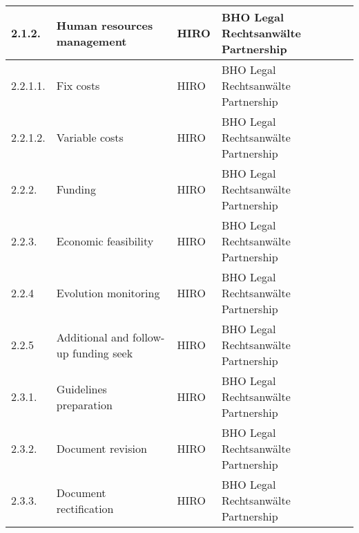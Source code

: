 \begin{longtable}[H]{p{1.5cm} >{\raggedright\arraybackslash}p{4cm} >{\raggedright\arraybackslash}p{3.8cm} >{\raggedright\arraybackslash}p{4cm}}
	\midrule
	
	2.1.2. & Human resources management & HIRO & BHO Legal Rechtsanwälte Partnership\vspace{0.2cm} \\
	
	\midrule
	
	2.2.1.1. & Fix costs & HIRO & BHO Legal Rechtsanwälte Partnership\vspace{0.2cm} \\
	
	\midrule
	
	2.2.1.2. & Variable costs & HIRO & BHO Legal Rechtsanwälte Partnership\vspace{0.2cm} \\
	
	\midrule
	
	2.2.2. & Funding & HIRO & BHO Legal Rechtsanwälte Partnership\vspace{0.2cm} \\
	
	\midrule
	
	2.2.3. & Economic feasibility & HIRO & BHO Legal Rechtsanwälte Partnership\vspace{0.2cm} \\
	
	\midrule
	
	2.2.4 & Evolution monitoring & HIRO & BHO Legal Rechtsanwälte Partnership\vspace{0.2cm} \\
	
	\midrule
	
	2.2.5 & Additional and follow-up funding seek & HIRO & BHO Legal Rechtsanwälte Partnership\vspace{0.2cm} \\
	
	\midrule
	
	2.3.1. & Guidelines preparation & HIRO & BHO Legal Rechtsanwälte Partnership\vspace{0.2cm} \\
	
	\midrule
	
	2.3.2. & Document revision & HIRO & BHO Legal Rechtsanwälte Partnership\vspace{0.2cm} \\
	
	\midrule
	
	2.3.3. & Document rectification & HIRO & BHO Legal Rechtsanwälte Partnership\vspace{0.2cm} \\
	

\end{longtable}
